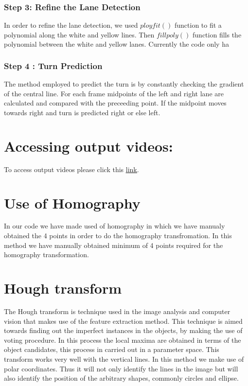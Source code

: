 \documentclass[12pt]{article}
\begin{document}
\subsubsection{Step 3: Reﬁne the Lane Detection }
In order to refine the lane detection, we used $ployfit()$ function to fit a polynomial along the white and yellow lines. Then $fillpoly()$ function fills the polynomial between the white and yellow lanes. Currently the code only ha

\subsubsection{Step 4 : Turn Prediction }
The method employed to predict the turn is by constantly checking the gradient of the central line. For each frame midpoints of the left and right lane are calculated and compared with the preceeding point. If the midpoint moves towards right and turn is predicted right or else left.

\section{Accessing output videos:}
To access output videos please click this \href{https://drive.google.com/drive/folders/1RHnAOEJLBZfpro_NCbA1NLVsmmTDlfqJ?usp=sharing}{\underline{link}}.
\section{Use of Homography}

In our code we have made used of homography in which we have manualy obtained the 4 points in order to do the homography transfromation. In this method we have manually obtained minimum of 4 points required for the homography transformation.   

\section{ Hough transform}
The Hough transform is technique used in the image analysis and computer vision that makes use of the feature extraction method. This technique is aimed towards finding out the imperfect instances in the objects, by making the use of voting procedure. In this process the local maxima are obtained in  terms of the object candidates, this process in carried out in a parameter space.
 This transform works very well with the vertical lines. In this method we make use of polar coordinates. Thus it will not only identify the lines in the image but will also identify the position of the arbitrary shapes, commonly circles and ellipse.
 
\end{document}
